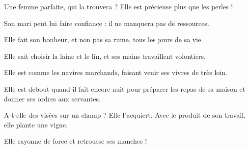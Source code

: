 Une femme parfaite, qui la trouvera ? Elle est précieuse plus que les perles !

Son mari peut lui faire confiance : il ne manquera pas de ressources.

Elle fait son bonheur, et non pas sa ruine, tous les jours de sa vie.

Elle sait choisir la laine et le lin, et ses mains travaillent volontiers.

Elle est comme les navires marchands, faisant venir ses vivres de très loin.

Elle est debout quand il fait encore nuit pour préparer les repas de sa maison et donner ses ordres aux servantes.

A-t-elle des visées sur un champ ? Elle l’acquiert. Avec le produit de son travail, elle plante une vigne.

Elle rayonne de force et retrousse ses manches !
